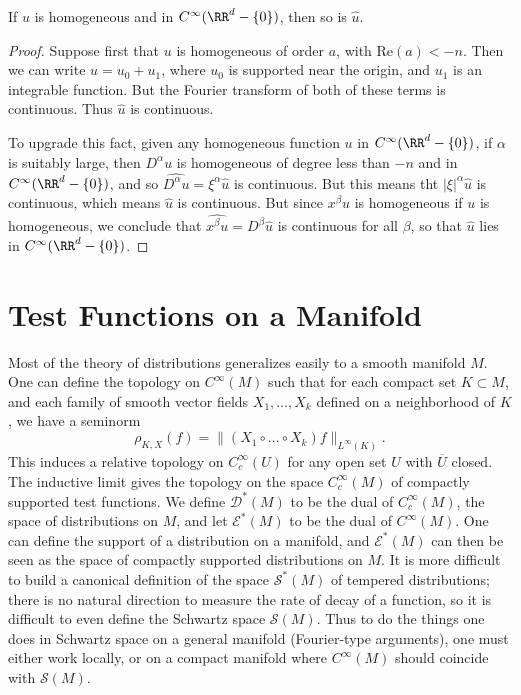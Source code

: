 \begin{lemma}
    If $u$ is homogeneous and in $C^\infty(\RR^d - \{ 0 \})$, then so is $\widehat{u}$.
\end{lemma}
\begin{proof}
    Suppose first that $u$ is homogeneous of order $a$, with $\text{Re}(a) < -n$. Then we can write $u = u_0 + u_1$, where $u_0$ is supported near the origin, and $u_1$ is an integrable function. But the Fourier transform of both of these terms is continuous. Thus $\widehat{u}$ is continuous.

    To upgrade this fact, given any homogeneous function $u$ in $C^\infty(\RR^d - \{ 0 \})$, if $\alpha$ is suitably large, then $D^\alpha u$ is homogeneous of degree less than $-n$ and in $C^\infty(\RR^d - \{ 0 \})$, and so $\widehat{D^\alpha u} = \xi^\alpha \widehat{u}$ is continuous. But this means tht $|\xi|^\alpha \widehat{u}$ is continuous, which means $\widehat{u}$ is continuous. But since $x^\beta u$ is homogeneous if $u$ is homogeneous, we conclude that $\widehat{x^\beta u} = D^\beta \widehat{u}$ is continuous for all $\beta$, so that $\widehat{u}$ lies in $C^\infty(\RR^d - \{ 0 \})$.
\end{proof}



\section{Test Functions on a Manifold}

Most of the theory of distributions generalizes easily to a smooth manifold $M$. One can define the topology on $C^\infty(M)$ such that for each compact set $K \subset M$, and each family of smooth vector fields $X_1,\dots,X_k$ defined on a neighborhood of $K$, we have a seminorm
%
\[ \rho_{K,X}(f) = \| (X_1 \circ \dots \circ X_k) f \|_{L^\infty(K)}. \]
%
This induces a relative topology on $C_c^\infty(U)$ for any open set $U$ with $\overline{U}$ closed. The inductive limit gives the topology on the space $C_c^\infty(M)$ of compactly supported test functions. We define $\mathcal{D}^*(M)$ to be the dual of $C_c^\infty(M)$, the space of distributions on $M$, and let $\mathcal{E}^*(M)$ to be the dual of $C^\infty(M)$. One can define the support of a distribution on a manifold, and $\mathcal{E}^*(M)$ can then be seen as the space of compactly supported distributions on $M$. It is more difficult to build a canonical definition of the space $\mathcal{S}^*(M)$ of tempered distributions; there is no natural direction to measure the rate of decay of a function, so it is difficult to even define the Schwartz space $\mathcal{S}(M)$. Thus to do the things one does in Schwartz space on a general manifold (Fourier-type arguments), one must either work locally, or on a compact manifold where $C^\infty(M)$ should coincide with $\mathcal{S}(M)$.


